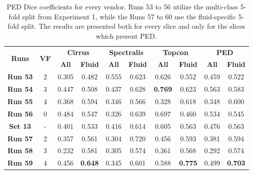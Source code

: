 \begin{table}[!ht]
	\caption{PED Dice coefficients for every vendor. Runs 53 to 56 utilize the multi-class 5-fold split from Experiment 1, while the Runs 57 to 60 use the fluid-specific 5-fold split. The results are presented both for every slice and only for the slices which present PED.}
	\centering
	\begin{tabular}{|c|c|cc|cc|cc|cc|}
		\hline
		\multirow{2}{*}{\textbf{Runs}} &
		\multirow{2}{*}{\textbf{VF}} & 
		\multicolumn{2}{c|}{\textbf{Cirrus}} & 
		\multicolumn{2}{c|}{\textbf{Spectralis}} & 
		\multicolumn{2}{c|}{\textbf{Topcon}} & 
		\multicolumn{2}{c|}{\textbf{PED}} \\ 
		\cline{3-10} & &
		\multicolumn{1}{c}{\textbf{All}} &  
		\textbf{\textbf{Fluid}} & 
		\multicolumn{1}{c}{\textbf{All}} &  
		\textbf{\textbf{Fluid}} & 
		\multicolumn{1}{c}{\textbf{All}} & 
		\textbf{\textbf{Fluid}} & 
		\multicolumn{1}{c}{\textbf{All}} & 
		\textbf{\textbf{Fluid}}\\ 
		
		\hline
		
		\textbf{Run 53} & 2 & 0.305 & 0.482 & 0.555 & 0.623 & 0.626 & 0.552 & 0.459 & 0.522 \\
		
		\textbf{Run 54} & 3 & 0.447 & 0.508 & 0.437 & 0.628 & \textbf{0.769} & 0.623 & 0.563 & 0.583 \\
		
		\textbf{Run 55} & 4 & 0.368 & 0.594 & 0.346 & 0.566 & 0.328 & 0.618 & 0.348 & 0.600 \\
		
		\textbf{Run 56} & 0 & 0.484 & 0.547 & 0.326 & 0.639 & 0.697 & 0.460 & 0.534 & 0.545 \\
		
		\hline
		
		\textbf{Set 13} & - & 0.401 & 0.533 & 0.416 & 0.614 & 0.605 & 0.563 & 0.476 & 0.563 \\
		
		\hline
		\hline
		
		\textbf{Run 57} & 2 & 0.357 & 0.561 & 0.304 & 0.720 & 0.456 & 0.593 & 0.381 & 0.594 \\
		
		\textbf{Run 58} & 3 & 0.232 & 0.581 & 0.305 & 0.574 & 0.361 & 0.568 & 0.292 & 0.574 \\
		
		\textbf{Run 59} & 4 & 0.456 & \textbf{0.648} & 0.345 & 0.601 & 0.588 & \textbf{0.775} & 0.499 & \textbf{0.703} \\
		

\end{tabular}
\end{table}
